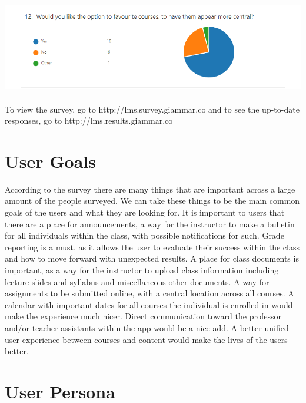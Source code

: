 \documentclass[12pt]{article}
\begin{document}
    \includegraphics[width=\textwidth]{survey/12.png}

    \paragraph{}
    To view the survey, go to http://lms.survey.giammar.co and to see the up-to-date\\responses, go to http://lms.results.giammar.co

    \section{User Goals}\label{sec:user-goals}

    According to the survey there are many things that are important across a large amount of the people surveyed.
    We can take these things to be the main common goals of the users and what they are looking for.
    It is important to users that there are a place for announcements, a way for the instructor to make a bulletin for all individuals within the class, with possible notifications for such.
    Grade reporting is a must, as it allows the user to evaluate their success within the class and how to move forward with unexpected results.
    A place for class documents is important, as a way for the instructor to upload class information including lecture slides and syllabus and miscellaneous other documents.
    A way for assignments to be submitted online, with a central location across all courses.
    A calendar with important dates for all courses the individual is enrolled in would make the experience much nicer.
    Direct communication toward the professor and/or teacher assistants within the app would be a nice add.
    A better unified user experience between courses and content would make the lives of the users better.


    \section{User Persona}\label{sec:user-persona}

\end{document}
